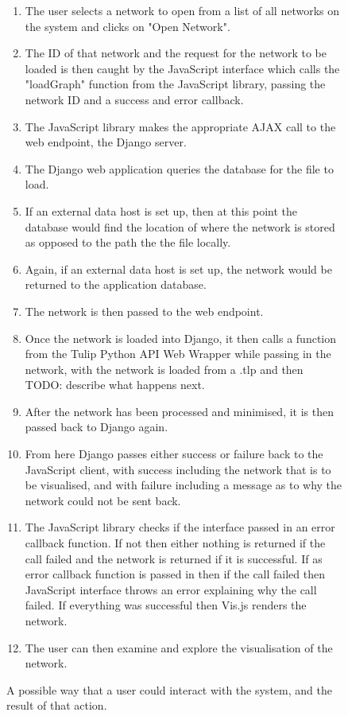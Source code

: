 \documentclass[../dissertation.tex]{subfiles}
\begin{document}
\begin{figure}
    \large
    \begin{enumerate}
        \item The user selects a network to open from a list of all networks on the system and clicks on "Open Network".
        \item The ID of that network and the request for the network to be loaded is then caught by the JavaScript interface which calls the "loadGraph" function from the JavaScript library, passing the network ID and a success and error callback.
        \item The JavaScript library makes the appropriate AJAX call to the web endpoint, the Django server.
        \item The Django web application queries the database for the file to load.
        \item If an external data host is set up, then at this point the database would find the location of where the network is stored as opposed to the path the the file locally.
        \item Again, if an external data host is set up, the network would be returned to the application database.
        \item The network is then passed to the web endpoint.
        \item Once the network is loaded into Django, it then calls a function from the Tulip Python API Web Wrapper while passing in the network, with the network is loaded from a .tlp and then TODO: describe what happens next.
        \item After the network has been processed and minimised, it is then passed back to Django again.
        \item From here Django passes either success or failure back to the JavaScript client, with success including the network that is to be visualised, and with failure including a message as to why the network could not be sent back.
        \item The JavaScript library checks if the interface passed in an error callback function. If not then either nothing is returned if the call failed and the network is returned if it is successful. If as error callback function is passed in then if the call failed then JavaScript interface throws an error explaining why the call failed. If everything was successful then Vis.js renders the network.
        \item The user can then examine and explore the visualisation of the network.
    \end{enumerate}
    \caption{A possible way that a user could interact with the system, and the result of that action.}
    \label{fig:sampledata}
\end{figure}
\end{document}
